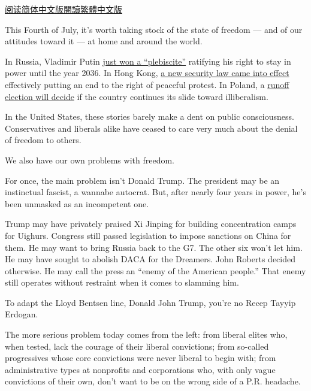 \href{https://cn.nytimes.com/opinion/20200706/orwell-fourth-of-july/}{阅读简体中文版}\href{https://cn.nytimes.com/opinion/20200706/orwell-fourth-of-july/zh-hant/}{閱讀繁體中文版}

This Fourth of July, it's worth taking stock of the state of freedom ---
and of our attitudes toward it --- at home and around the world.

In Russia, Vladimir Putin
\href{https://www.nytimes.com/2020/07/01/world/europe/putin-referendum-vote-russia.html?action=click\&module=Top\%20Stories\&pgtype=Homepage}{just
won a ``plebiscite''} ratifying his right to stay in power until the
year 2036. In Hong Kong,
\href{https://www.nytimes.com/2020/07/01/world/asia/hong-kong-security-law-china.html}{a
new security law came into effect} effectively putting an end to the
right of peaceful protest. In Poland, a
\href{https://foreignpolicy.com/2020/05/04/poland-is-showing-the-world-how-not-to-run-a-pandemic-election/}{runoff
election will decide} if the country continues its slide toward
illiberalism.

In the United States, these stories barely make a dent on public
consciousness. Conservatives and liberals alike have ceased to care very
much about the denial of freedom to others.

We also have our own problems with freedom.

For once, the main problem isn't Donald Trump. The president may be an
instinctual fascist, a wannabe autocrat. But, after nearly four years in
power, he's been unmasked as an incompetent one.

Trump may have privately praised Xi Jinping for building concentration
camps for Uighurs. Congress still passed legislation to impose sanctions
on China for them. He may want to bring Russia back to the G7. The other
six won't let him. He may have sought to abolish DACA for the Dreamers.
John Roberts decided otherwise. He may call the press an ``enemy of the
American people.'' That enemy still operates without restraint when it
comes to slamming him.

To adapt the Lloyd Bentsen line, Donald John Trump, you're no Recep
Tayyip Erdogan.

The more serious problem today comes from the left: from liberal elites
who, when tested, lack the courage of their liberal convictions; from
so-called progressives whose core convictions were never liberal to
begin with; from administrative types at nonprofits and corporations
who, with only vague convictions of their own, don't want to be on the
wrong side of a P.R. headache.


